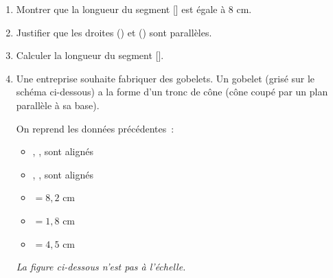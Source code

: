 \documentclass[exercice, a4]{thedocument}%
\begin{document}
    \begin{enumerate}
        \item Montrer que la longueur du segment [] est égale à 8 cm.
        \item Justifier que les droites () et () sont parallèles.
        \item Calculer la longueur du segment [].
        \item Une entreprise souhaite fabriquer des gobelets. Un gobelet (grisé sur le schéma ci-dessous) a la forme d'un tronc de cône (cône coupé par un plan parallèle à sa base).

    \medskip

    \begin{minipage}{0.48\linewidth}
    On reprend les données précédentes~:

    \begin{itemize}
        \item {}, ,  sont alignés
        \item {}, ,  sont alignés
        \item {} $= 8,2$ cm
        \item {} $= 1,8$ cm
        \item {} $= 4,5$ cm
    \end{itemize}
    \end{minipage}\hfill
    \begin{minipage}{0.48\linewidth}
        \emph{La figure ci-dessous n'est pas à l'échelle.}

        \medskip

        \begin{center}
        \end{center}
    \end{minipage}


\end{enumerate}
\end{document}
